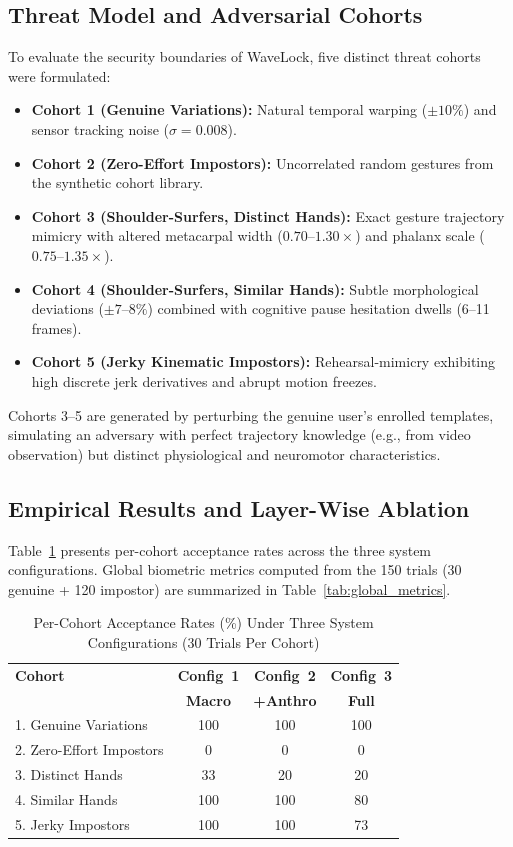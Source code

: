 \documentclass[conference]{IEEEtran}
\begin{document}
\subsection{Threat Model and Adversarial Cohorts}
To evaluate the security boundaries of WaveLock, five distinct threat cohorts were formulated:
\begin{itemize}
\item \textbf{Cohort 1 (Genuine Variations):} Natural temporal warping ($\pm 10\%$) and sensor tracking noise ($\sigma = 0.008$).
\item \textbf{Cohort 2 (Zero-Effort Impostors):} Uncorrelated random gestures from the synthetic cohort library.
\item \textbf{Cohort 3 (Shoulder-Surfers, Distinct Hands):} Exact gesture trajectory mimicry with altered metacarpal width ($0.70\text{--}1.30\times$) and phalanx scale ($0.75\text{--}1.35\times$).
\item \textbf{Cohort 4 (Shoulder-Surfers, Similar Hands):} Subtle morphological deviations ($\pm 7\text{--}8\%$) combined with cognitive pause hesitation dwells (6--11 frames).
\item \textbf{Cohort 5 (Jerky Kinematic Impostors):} Rehearsal-mimicry exhibiting high discrete jerk derivatives and abrupt motion freezes.
\end{itemize}
Cohorts 3--5 are generated by perturbing the genuine user's enrolled templates, simulating an adversary with perfect trajectory knowledge (e.g., from video observation) but distinct physiological and neuromotor characteristics.


\subsection{Empirical Results and Layer-Wise Ablation}

Table~\ref{tab:cohort_results} presents per-cohort acceptance rates across the three system configurations. Global biometric metrics computed from the 150 trials (30 genuine + 120 impostor) are summarized in Table~\ref{tab:global_metrics}.

\begin{table}[h]
\centering
\caption{Per-Cohort Acceptance Rates (\%) Under Three System Configurations (30 Trials Per Cohort)}
\label{tab:cohort_results}
\renewcommand{\arraystretch}{1.15}
\begin{tabular}{@{}l c c c@{}}
\toprule
\textbf{Cohort} & \textbf{Config~1} & \textbf{Config~2} & \textbf{Config~3} \\
 & \textbf{Macro} & \textbf{+Anthro} & \textbf{Full} \\
\midrule
1. Genuine Variations & 100 & 100 & 100 \\
2. Zero-Effort Impostors & 0 & 0 & 0 \\
3. Distinct Hands & 33 & 20 & 20 \\
4. Similar Hands & 100 & 100 & 80 \\
5. Jerky Impostors & 100 & 100 & 73 \\
\bottomrule
\end{tabular}
\end{table}
\end{document}
